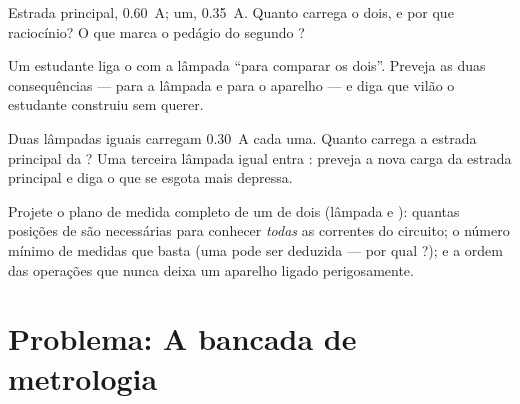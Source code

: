 \begin{exercise}[$\star\star$]\label{exo:g8:intensity-ammeter:9}
Estrada principal, \qty{0.60}{A};  um, \qty{0.35}{A}. Quanto
carrega o  dois, e por que raciocínio? O que marca o pedágio do
segundo ?
\end{exercise}

\begin{exercise}[$\star\star$]\label{exo:g8:intensity-ammeter:10}
Um estudante liga o  \emph{} com a lâmpada
``para comparar os dois''. Preveja as duas consequências --- para a
lâmpada e para o aparelho --- e diga que vilão o estudante construiu
sem querer.
\end{exercise}

\begin{exercise}[$\star\star$]\label{exo:g8:intensity-ammeter:11}
Duas lâmpadas iguais  carregam \qty{0.30}{A} cada uma.
Quanto carrega a estrada principal da ? Uma terceira lâmpada
igual entra : preveja a nova carga da estrada principal e
diga o que se esgota mais depressa.
\end{exercise}

\begin{exercise}[$\star\star\star$]\label{exo:g8:intensity-ammeter:12}
Projete o plano de medida completo de um  de dois
 (lâmpada e ): quantas posições de  são
necessárias para conhecer \emph{todas} as correntes do circuito; o
número mínimo de medidas que basta (uma pode ser deduzida --- por qual
?); e a ordem das operações que nunca deixa um aparelho
ligado perigosamente.
\end{exercise}

\section{Problema: A bancada de metrologia}

